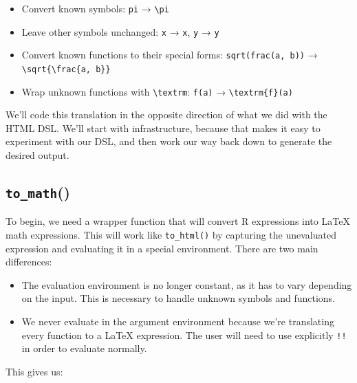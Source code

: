 \documentclass[]{book}
\begin{document}
\begin{itemize}
\item
  Convert known symbols: \texttt{pi} → \texttt{\textbackslash{}pi}
\item
  Leave other symbols unchanged: \texttt{x} → \texttt{x}, \texttt{y} → \texttt{y}
\item
  Convert known functions to their special forms: \texttt{sqrt(frac(a,\ b))} →
  \texttt{\textbackslash{}sqrt\{\textbackslash{}frac\{a,\ b\}\}}
\item
  Wrap unknown functions with \texttt{\textbackslash{}textrm}: \texttt{f(a)} → \texttt{\textbackslash{}textrm\{f\}(a)}
\end{itemize}

We'll code this translation in the opposite direction of what we did with the HTML DSL. We'll start with infrastructure, because that makes it easy to experiment with our DSL, and then work our way back down to generate the desired output.

\hypertarget{to_math}{%
\subsection{\texorpdfstring{\texttt{to\_math}()}{to\_math()}}\label{to_math}}

To begin, we need a wrapper function that will convert R expressions into LaTeX math expressions. This will work like \texttt{to\_html()} by capturing the unevaluated expression and evaluating it in a special environment. There are two main differences:

\begin{itemize}
\item
  The evaluation environment is no longer constant, as it has to vary depending on
  the input. This is necessary to handle unknown symbols and functions.
\item
  We never evaluate in the argument environment because we're translating every
  function to a LaTeX expression. The user will need to use explicitly \texttt{!!} in
  order to evaluate normally.
\end{itemize}

This gives us:
\end{document}

